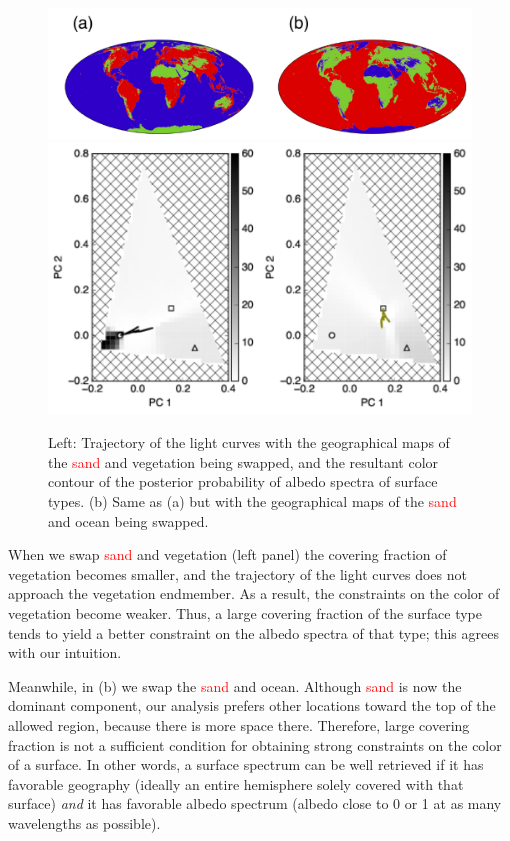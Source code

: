 \documentclass[iop,numberedappendix,apj]{emulateapj}
\def\edit#1{\textcolor{red}{#1}}
\begin{document}
\begin{figure}[htb!]
    \begin{center}
    \includegraphics[width=\hsize]{swap_map.pdf}
    \includegraphics[width=\hsize]{mockdata_90deg_3types23_t360_lc_noreg_allowedregion_gray.pdf}
    \end{center}
    \caption{Left: Trajectory of the light curves with the geographical maps of the \edit{sand} and vegetation being swapped, and the resultant color contour of the posterior probability of albedo spectra of surface types. (b) Same as (a) but with the geographical maps of the \edit{sand} and ocean being swapped.}
\label{fig:swap}
\end{figure}

When we swap \edit{sand} and vegetation (left panel) the covering fraction of vegetation becomes smaller, and the trajectory of the light curves does not approach the vegetation endmember. As a result, the constraints on the color of vegetation become weaker. Thus, a large covering fraction of the surface type tends to yield a better constraint on the albedo spectra of that type; this agrees with our intuition.  

Meanwhile, in (b) we swap the \edit{sand} and ocean.  
Although \edit{sand} is now the dominant component, 
our analysis prefers other locations toward the top of the allowed region, because there is more space there. 
Therefore, large covering fraction is not a sufficient condition for obtaining strong constraints on the color of a surface. 
In other words, a surface spectrum can be well retrieved if it has favorable geography (ideally an entire hemisphere solely covered with that surface) {\it and} it has favorable albedo spectrum (albedo close to 0 or 1 at as many wavelengths as possible). 
\end{document}
